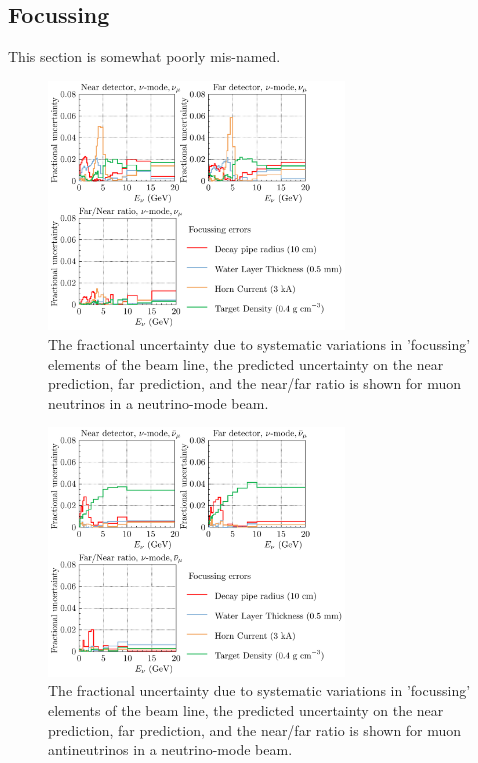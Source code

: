 \documentclass{article}
\begin{document}
\subsection{Focussing}

This section is somewhat poorly mis-named.

\begin{figure}
  \centering
  \includegraphics[width=0.7\textwidth]{plots/fracerrs/numode_numu_Focussing}
  \caption{The fractional uncertainty due to systematic variations in 'focussing' elements of the beam line, the predicted uncertainty on the near prediction, far prediction, and the near/far ratio is shown for muon neutrinos in a neutrino-mode beam. }
  \label{fig:foc_nu_numu}
\end{figure}

\begin{figure}
  \centering
  \includegraphics[width=0.7\textwidth]{plots/fracerrs/numode_numubar_Focussing}
  \caption{The fractional uncertainty due to systematic variations in 'focussing' elements of the beam line, the predicted uncertainty on the near prediction, far prediction, and the near/far ratio is shown for muon antineutrinos in a neutrino-mode beam.}
  \label{fig:foc_nu_numubar}
\end{figure}
\end{document}
